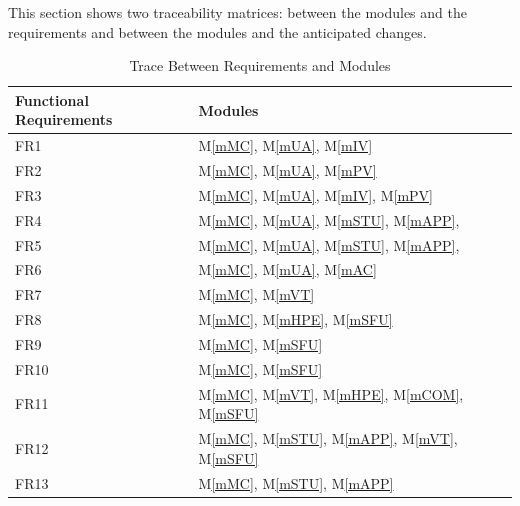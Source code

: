 \documentclass[12pt, titlepage]{article}
\newcommand{\mref}[1]{M\ref{#1}}
\begin{document}
This section shows two traceability matrices: between the modules and the
requirements and between the modules and the anticipated changes.

\begin{table}[H]
\centering
\begin{tabular}{p{} p{}}
\toprule
\textbf{Functional Requirements} & \textbf{Modules}\\
\midrule
FR1 & \mref{mMC}, \mref{mUA}, \mref{mIV}\\
FR2 & \mref{mMC}, \mref{mUA}, \mref{mPV}\\
FR3 & \mref{mMC}, \mref{mUA}, \mref{mIV}, \mref{mPV}\\
FR4 & \mref{mMC}, \mref{mUA}, \mref{mSTU}, \mref{mAPP},\\
FR5 & \mref{mMC}, \mref{mUA}, \mref{mSTU}, \mref{mAPP},\\
FR6 & \mref{mMC}, \mref{mUA}, \mref{mAC}\\
FR7 & \mref{mMC}, \mref{mVT}\\
FR8 & \mref{mMC}, \mref{mHPE}, \mref{mSFU}\\
FR9 & \mref{mMC}, \mref{mSFU}\\
FR10 & \mref{mMC}, \mref{mSFU}\\
FR11 & \mref{mMC}, \mref{mVT}, \mref{mHPE}, \mref{mCOM}, \mref{mSFU}\\
FR12 & \mref{mMC}, \mref{mSTU}, \mref{mAPP}, \mref{mVT}, \mref{mSFU}\\
FR13 & \mref{mMC}, \mref{mSTU}, \mref{mAPP}\\
\bottomrule
\end{tabular}
\caption{Trace Between Requirements and Modules}
\label{TblRT}
\end{table}
\end{document}
